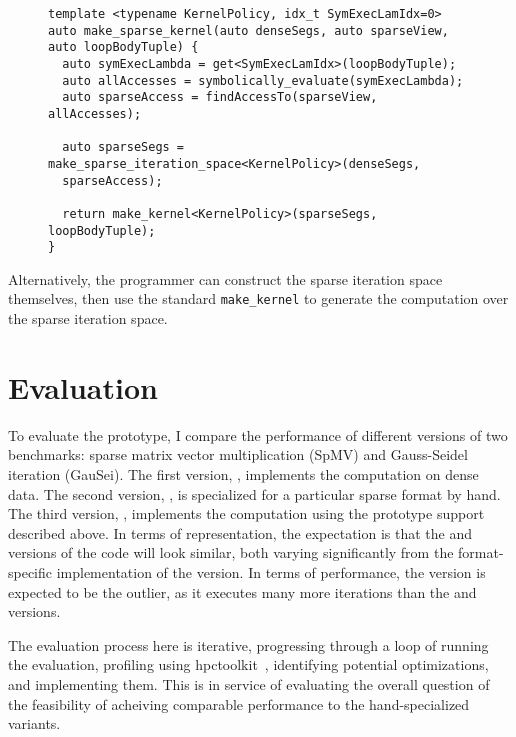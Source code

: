 \begin{figure}
\begin{lstlisting}[caption={Abbreviated implementation of the function for creating a computation that automatically constructs the sparse iteration space.}, label=makeSparseKernelAlg]
template <typename KernelPolicy, idx_t SymExecLamIdx=0>
auto make_sparse_kernel(auto denseSegs, auto sparseView, auto loopBodyTuple) {
  auto symExecLambda = get<SymExecLamIdx>(loopBodyTuple);
  auto allAccesses = symbolically_evaluate(symExecLambda);
  auto sparseAccess = findAccessTo(sparseView, allAccesses);

  auto sparseSegs = make_sparse_iteration_space<KernelPolicy>(denseSegs, 
  sparseAccess);

  return make_kernel<KernelPolicy>(sparseSegs, loopBodyTuple);
}
\end{lstlisting}
\end{figure}

Alternatively, the programmer can construct the sparse iteration space themselves, then use the standard \verb.make_kernel. to generate the computation over the sparse iteration space.

\section{Evaluation}\label{sec:sparseEval}
To evaluate the prototype, I compare the performance of different versions of two benchmarks: sparse matrix vector multiplication (SpMV) and Gauss-Seidel iteration (GauSei).
The first version, \dense, implements the computation on dense data. 
The second version, \specialized, is specialized for a particular sparse format by hand. 
The third version, \sparseraja, implements the computation using the prototype support described above.
In terms of representation, the expectation is that the \dense{} and \sparseraja{} versions of the code will look similar, both varying significantly from the format-specific implementation of the \specialized{} version.
In terms of performance, the \dense{} version is expected to be the outlier, as it executes many more iterations than the \sparseraja{} and \specialized{} versions.

The evaluation process here is iterative, progressing through a loop of running the evaluation, profiling using hpctoolkit~\cite{adhianto2010hpctoolkit}, identifying potential optimizations, and implementing them. 
This is in service of evaluating the overall question of the feasibility of acheiving comparable performance to the hand-specialized variants.


